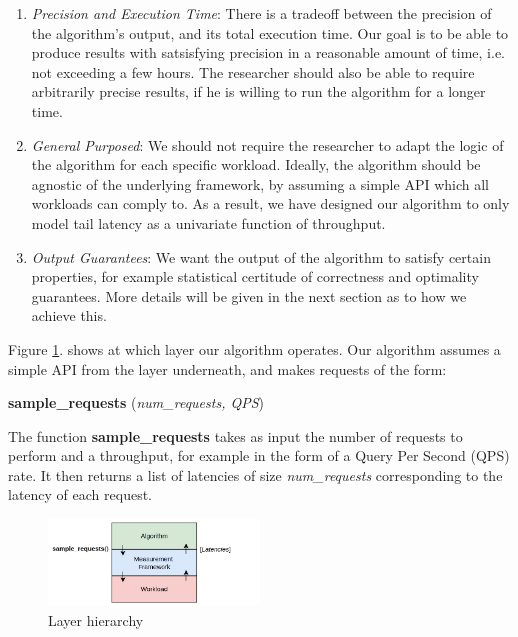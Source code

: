 \documentclass[10pt,conference,compsocconf]{IEEEtran}
\begin{document}
\begin{enumerate}
	\item \textit{Precision and Execution Time}: There is a tradeoff between the precision of the algorithm's output, and its total execution time. Our goal is to be able to produce results with satsisfying precision in a reasonable amount of time, i.e. not exceeding a few hours. The researcher should also be able to require arbitrarily precise results, if he is willing to run the algorithm for a longer time.

	\item \textit{General Purposed}: We should not require the researcher to adapt the logic of the algorithm for each specific workload. Ideally, the algorithm should be agnostic of the underlying framework, by assuming a simple API which all workloads can comply to. As a result, we have designed our algorithm to only model tail latency as a univariate function of throughput.

	\item \textit{Output Guarantees}: We want the output of the algorithm to satisfy certain properties, for example statistical certitude of correctness and optimality guarantees. More details will be given in the next section as to how we achieve this.
\end{enumerate}

Figure \ref{fig:layers}. shows at which layer our algorithm operates. Our algorithm assumes a simple API from the layer underneath, and makes requests of the form:

\vspace{0.5em}
 \textbf{sample\_requests} (\textit{num\_requests, QPS})
\vspace{0.5em}

The function \textbf{sample\_requests} takes as input the number of requests to perform and a throughput, for example in the form of a Query Per Second (QPS) rate. It then returns a list of latencies of size \textit{num\_requests} corresponding to the latency of each request.

\begin{figure}[H]
	\centering
	\includegraphics[width=0.5\textwidth]{layers.png}
	\vspace{-1em}
	\caption{Layer hierarchy}
	\label{fig:layers}
\end{figure}
\end{document}
